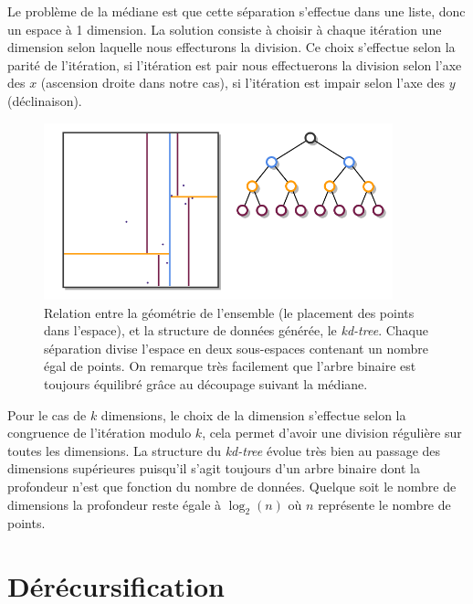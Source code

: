 Le problème de la médiane est que cette séparation s'effectue dans une liste, donc un espace à 1 dimension. La solution consiste à choisir à chaque itération une dimension selon laquelle nous effecturons la division. Ce choix s'effectue selon la parité de l'itération, si l'itération est pair nous effectuerons la division selon l'axe des $x$ (ascension droite dans notre cas), si l'itération est impair selon l'axe des $y$ (déclinaison).

	\begin{figure}[h]
		\centering
		\includegraphics[width=0.9\textwidth]{img/kdtree.png}
		\caption[Relation entre la géométrie de l'ensemble et le \emph{kd-tree} généré]{Relation entre la géométrie de l'ensemble (le placement des points dans l'espace), et la structure de données générée, le \emph{kd-tree}. Chaque séparation divise l'espace en deux sous-espaces contenant un nombre égal de points. On remarque très facilement que l'arbre binaire est toujours équilibré grâce au découpage suivant la médiane.}
		\label{fig:kdtree}
	\end{figure}

Pour le cas de $k$ dimensions, le choix de la dimension s'effectue selon la congruence de l'itération modulo $k$, cela permet d'avoir une division régulière sur toutes les dimensions. La structure du \emph{kd-tree} évolue très bien au passage des dimensions supérieures puisqu'il s'agit toujours d'un arbre binaire dont la profondeur n'est que fonction du nombre de données. Quelque soit le nombre de dimensions la profondeur reste égale à $\log_{2}(n)$ où $n$ représente le nombre de points.



\section{Dérécursification}

